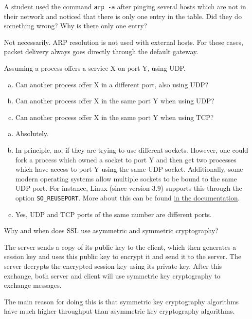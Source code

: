 \begin{Exercise}
A student used the command \texttt{arp -a} after pinging several hosts which are not in their network and noticed that there is only one entry in the table.
Did they do something wrong? Why is there only one entry?
\end{Exercise}
\begin{Answer}
Not necessarily. ARP resolution is not used with external hosts.
For these cases, packet delivery always goes directly through the default gateway.
\end{Answer}

\begin{Exercise}
Assuming a process offers a service X on port Y, using UDP.
\begin{enumerate}[a)]
\item Can another process offer X in a different port, also using UDP?
\item Can another process offer X in the same port Y when using UDP?
\item Can another process offer X in the same port Y when using TCP?
\end{enumerate}
\end{Exercise}
\begin{Answer}
\begin{enumerate}[a)]
\item Absolutely.
\item In principle, no, if they are trying to use different sockets.
However, one could fork a process which owned a socket to port Y and then get two processes which have access to port Y using the same UDP socket.
Additionally, some modern operating systems allow multiple sockets to be bound to the same UDP port. For instance, Linux (since version 3.9) supports this through the option \texttt{SO\_REUSEPORT}. More about this can be found \href{http://man7.org/linux/man-pages/man7/socket.7.html}{in the documentation}.
\item Yes, UDP and TCP ports of the same number are different ports.
\end{enumerate}
\end{Answer}

\begin{Exercise}
Why and when does SSL use asymmetric and symmetric cryptography?
\end{Exercise}
\begin{Answer}
The server sends a copy of its public key to the client, which then generates a session key and uses this public key to encrypt it and send it to the server.
The server decrypts the encrypted session key using its private key.
After this exchange, both server and client will use symmetric key cryptography to exchange messages.

The main reason for doing this is that symmetric key cryptography algorithms have much higher throughput than asymmetric key cryptography algorithms.
\end{Answer}

